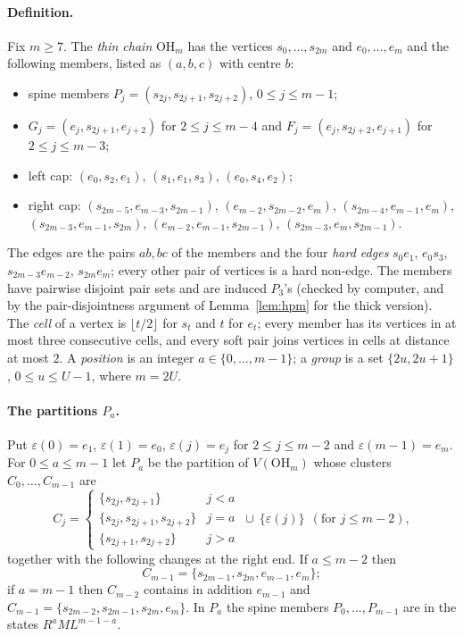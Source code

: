 \paragraph{Definition.} Fix $m\ge7$. The \emph{thin chain} $\mathrm{OH}_m$ has the vertices $s_0,\dots,s_{2m}$ and $e_0,\dots,e_m$ and the following members, listed as $(a,b,c)$ with centre $b$:
\begin{itemize}
\item spine members $P_j=(s_{2j},s_{2j+1},s_{2j+2})$, $0\le j\le m-1$;
\item $G_j=(e_j,s_{2j+1},e_{j+2})$ for $2\le j\le m-4$ and $F_j=(e_j,s_{2j+2},e_{j+1})$ for $2\le j\le m-3$;
\item left cap: $(e_0,s_2,e_1)$, $(s_1,e_1,s_3)$, $(e_0,s_4,e_2)$;
\item right cap: $(s_{2m-5},e_{m-3},s_{2m-1})$, $(e_{m-2},s_{2m-2},e_m)$, $(s_{2m-4},e_{m-1},e_m)$, $(s_{2m-3},e_{m-1},s_{2m})$, $(e_{m-2},e_{m-1},s_{2m-1})$, $(s_{2m-3},e_m,s_{2m-1})$.
\end{itemize}
The edges are the pairs $ab,bc$ of the members and the four \emph{hard edges} $s_0e_1$, $e_0s_3$, $s_{2m-3}e_{m-2}$, $s_{2m}e_m$; every other pair of vertices is a hard non-edge. The members have pairwise disjoint pair sets and are induced $P_3$'s (checked by computer, and by the pair-disjointness argument of Lemma~\ref{lem:hpm} for the thick version). The \emph{cell} of a vertex is $\lfloor t/2\rfloor$ for $s_t$ and $t$ for $e_t$; every member has its vertices in at most three consecutive cells, and every soft pair joins vertices in cells at distance at most $2$. A \emph{position} is an integer $a\in\{0,\dots,m-1\}$; a \emph{group} is a set $\{2u,2u+1\}$, $0\le u\le U-1$, where $m=2U$.

\paragraph{The partitions $P_a$.} Put $\varepsilon(0)=e_1$, $\varepsilon(1)=e_0$, $\varepsilon(j)=e_j$ for $2\le j\le m-2$ and $\varepsilon(m-1)=e_m$. For $0\le a\le m-1$ let $P_a$ be the partition of $V(\mathrm{OH}_m)$ whose clusters $C_0,\dots,C_{m-1}$ are
\[
C_j=\begin{cases}\{s_{2j},s_{2j+1}\}&j<a\\ \{s_{2j},s_{2j+1},s_{2j+2}\}&j=a\\ \{s_{2j+1},s_{2j+2}\}&j>a\end{cases}\ \cup\ \{\varepsilon(j)\}\ \ (\text{for }j\le m-2),
\]
together with the following changes at the right end. If $a\le m-2$ then
\[C_{m-1}=\{s_{2m-1},s_{2m},e_{m-1},e_m\};\]
if $a=m-1$ then $C_{m-2}$ contains in addition $e_{m-1}$ and $C_{m-1}=\{s_{2m-2},s_{2m-1},s_{2m},e_m\}$. In $P_a$ the spine members $P_0,\dots,P_{m-1}$ are in the states $R^{a}ML^{m-1-a}$.

